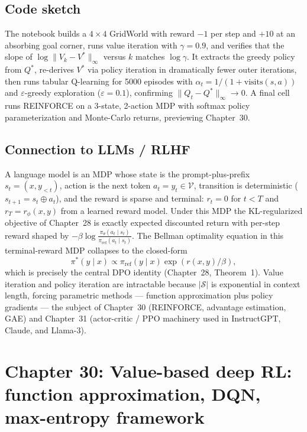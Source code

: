 \documentclass[11pt]{article}
\theoremstyle{remark}
\begin{document}
\subsection*{Code sketch}

The notebook builds a $4{\times}4$ GridWorld with reward $-1$ per step and $+10$ at an absorbing goal corner, runs value iteration with $\gamma = 0.9$, and verifies that the slope of $\log \|V_k - V^*\|_\infty$ versus $k$ matches $\log\gamma$. It extracts the greedy policy from $Q^*$, re-derives $V^*$ via policy iteration in dramatically fewer outer iterations, then runs tabular Q-learning for 5000 episodes with $\alpha_t = 1/(1+\mathrm{visits}(s,a))$ and $\varepsilon$-greedy exploration ($\varepsilon=0.1$), confirming $\|Q_t - Q^*\|_\infty \to 0$. A final cell runs REINFORCE on a 3-state, 2-action MDP with softmax policy parameterization and Monte-Carlo returns, previewing Chapter~30.

\subsection*{Connection to LLMs / RLHF}

A language model is an MDP whose state is the prompt-plus-prefix $s_t = (x, y_{<t})$, action is the next token $a_t = y_t \in \mathcal{V}$, transition is deterministic ($s_{t+1} = s_t \oplus a_t$), and the reward is sparse and terminal: $r_t = 0$ for $t<T$ and $r_T = r_\phi(x,y)$ from a learned reward model. Under this MDP the KL-regularized objective of Chapter~28 is exactly expected discounted return with per-step reward shaped by $-\beta \log\frac{\pi_\theta(a_t\mid s_t)}{\pi_{\mathrm{ref}}(a_t\mid s_t)}$. The Bellman optimality equation in this terminal-reward MDP collapses to the closed-form
\[
\pi^*(y\mid x) \propto \pi_{\mathrm{ref}}(y\mid x)\exp(r(x,y)/\beta),
\]
which is precisely the central DPO identity (Chapter~28, Theorem~1). Value iteration and policy iteration are intractable because $|\mathcal{S}|$ is exponential in context length, forcing parametric methods --- function approximation plus policy gradients --- the subject of Chapter~30 (REINFORCE, advantage estimation, GAE) and Chapter~31 (actor-critic / PPO machinery used in InstructGPT, Claude, and Llama-3).


\section*{Chapter 30: Value-based deep RL: function approximation, DQN, max-entropy framework}
\end{document}
